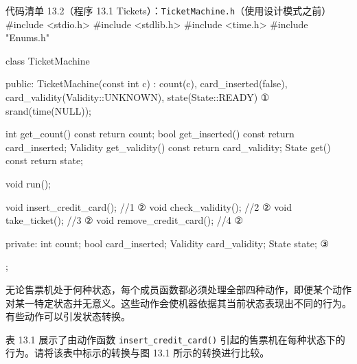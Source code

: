 \begin{codeboxt}{代码清单 13.2（程序 13.1 Tickets）：\texttt{Ticket\allowbreak{}Machine.\allowbreak{}h}（使用设计模式之前）}
#include <stdio.h>
#include <stdlib.h>
#include <time.h>
#include "Enums.h"

class TicketMachine
{
public:
    TicketMachine(const int c)
        : count(c), card_inserted(false),
          card_validity(Validity::UNKNOWN), state(State::READY) ①
    {
        srand(time(NULL));
    }

    int      get_count()    const { return count; }
    bool     get_inserted() const { return card_inserted; }
    Validity get_validity() const { return card_validity; }
    State    get()    const { return state; }

    void run();

    void insert_credit_card();  //1                            ②
    void check_validity();      //2                            ②
    void take_ticket();         //3                            ②
    void remove_credit_card();  //4                            ②

private:
    int      count;
    bool     card_inserted;
    Validity card_validity;
    State    state;                                             ③
};
\end{codeboxt}
\par
{}\par
{}\par

无论售票机处于何种状态，每个成员函数都必须处理全部四种动作，即便某个动作对某一特定状态并无意义。这些动作会使机器依据其当前状态表现出不同的行为。有些动作可以引发状态转换。

表 13.1 展示了由动作函数 \texttt{insert\_\allowbreak{}credit\_\allowbreak{}card(\allowbreak{})\allowbreak{}} 引起的售票机在每种状态下的行为。请将该表中标示的转换与图 13.1 所示的转换进行比较。

